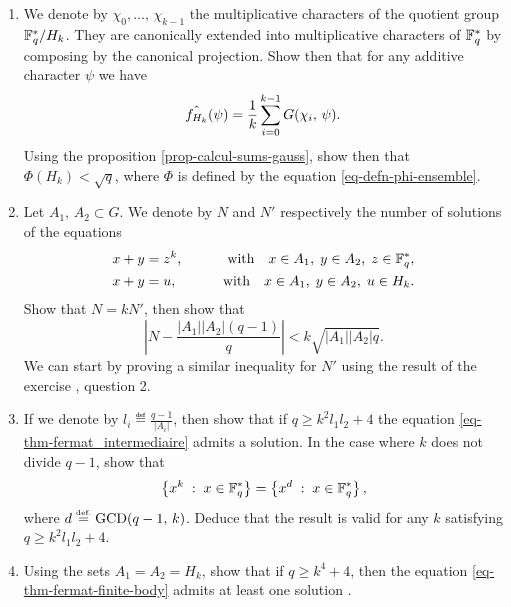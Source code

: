 \begin{exo}
\begin{enumerate}
\item {} We denote by $ \chi_0, \ldots, \, \chi_{k-1} $ the multiplicative characters of the quotient group $ \mathbb{F}_q^* / H_k $. They are canonically extended into multiplicative characters of $ \mathbb{F}_q^* $ by composing by the canonical projection. Show then that for any additive character $ \psi $ we have
\begin{equation*}
\hat{f_{H_k}} (\psi) = \frac{1}{k} \sum_{i = 0}^{k-1}{G (\chi_i, \, \psi)}.
\end{equation*}
Using the proposition \ref{prop-calcul-sums-gauss}, show then that $ \Phi (H_k) <\sqrt{q} $, where $ \Phi $ is defined by the equation \eqref{eq-defn-phi-ensemble}.
\item Let $ A_1, \, A_2 \subset G $. We denote by $ N $ and $ N'$ respectively the number of solutions of the equations
\begin{align}
\label{eq-thm-fermat_intermediaire}
x + y & = z^k, \quad \quad & \text{with} \quad x \in A_1, \; y \in A_2, \; z \in \mathbb{F}_q^*, \\
x + y & = u, \quad \quad & \text{with} \quad x \in A_1, \; y \in A_2, \; u \in H_k.
\end{align}
Show that $ N = k N'$, then show that
\begin{equation}
\label{eqn-fermat-majoration}
\left| N - \frac{| A_1 | | A_2 | (q-1)}{q} \right| <k \sqrt{| A_1 | | A_2 | q}.
\end{equation}
We can start by proving a similar inequality for $ N'$ using the result of the exercise , question 2.
\item If we denote by $ l_i \eqdef \frac{q-1}{| A_i |} $, then show that if $ q \geq k^2 l_1 l_2 + 4 $ the equation \eqref{eq-thm-fermat_intermediaire} admits a solution. In the case where $ k $ does not divide $ q-1 $, show that
\begin{equation*}
\left\{ x^k \;:\; x \in \mathbb{F}_q^* \right\} = \left\{ x^d \;:\; x \in \mathbb{F}_q^* \right\},
\end{equation*}
where $ d \stackrel{\mbox{\upshape\tiny def.}}{=} \operatorname{GCD} (q-1, \, k) $. Deduce that the result is valid for any $ k $ satisfying $ q \geq k^2 l_1 l_2 + 4 $.
\item Using the sets $ A_1 = A_2 = H_k $, show that if $ q \geq k^4 + 4 $, then the equation \eqref{eq-thm-fermat-finite-body} admits at least one solution .
\end{enumerate}
\end{exo}
 
